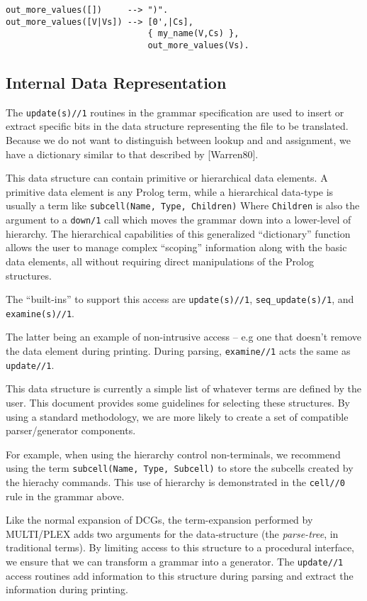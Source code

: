 \begin{verbatim}
out_more_values([])     --> ")".
out_more_values([V|Vs]) --> [0',|Cs],
                            { my_name(V,Cs) },
                            out_more_values(Vs).
\end{verbatim}

\subsection{Internal Data Representation}
The {\tt update(s)//1} routines in the grammar specification
are used to insert or extract specific bits in the
data structure representing the file to be translated.
Because we do not want to distinguish between lookup and
and assignment, we have a dictionary similar to that
described by [Warren80].

This data structure can contain primitive or
hierarchical data elements.
A primitive data element is any Prolog term, 
while a hierarchical data-type is usually
a term like {\tt subcell(Name, Type, Children)}
Where {\tt Children} is also the argument to a
{\tt down/1} call which moves the grammar down
into a lower-level of hierarchy.
The hierarchical capabilities of this generalized ``dictionary''
function allows the user to manage complex ``scoping''
information along with the basic data elements, all
without requiring direct manipulations of the Prolog structures.

The ``built-ins'' to support this access are
{\tt update(s)//1},  {\tt seq\_update(s)/1}, and {\tt examine(s)//1}.

The latter being an example of non-intrusive access
-- e.g one that doesn't remove the data element during
printing. During parsing, {\tt examine//1} acts
the same as {\tt update//1}.

This data structure is currently a simple list of 
whatever terms are defined by the user. This document 
provides some guidelines for selecting these structures.
By using a standard methodology, we are more likely
to create a set of compatible parser/generator components.

For example, when using the hierarchy control non-terminals,
we recommend using the term {\tt subcell(Name, Type, Subcell)}
to store the subcells created by the hierachy commands.
This use of hierarchy is demonstrated in the {\tt cell//0}
rule in the grammar above.

Like the normal expansion of DCGs, the term-expansion
performed by MULTI/PLEX adds two arguments for the data-structure
(the {\it parse-tree}, in traditional terms).
By limiting access to this structure to a procedural
interface, we ensure that we can transform a grammar
into a generator. The {\tt update//1} access routines
add information to this structure during parsing and
extract the information during printing.

